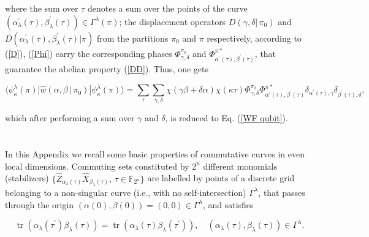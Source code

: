 \documentclass[quantumrep,article,submit,pdftex,moreauthors]{Definitions/mdpi}
\DeclareMathOperator{\tr}{tr}
\begin{document}
where the sum over $\tau$ denotes a sum over the points of the curve
$\left(\alpha_{\lambda}^{\prime}(\tau),\beta_{\lambda}^{\prime}(\tau)\right) \in
\Gamma^{\lambda}(\pi)$; the displacement operators $D\left(\gamma,\delta
|\,\pi_{0}\right)$ and
$D\left(\alpha_{\lambda}^{\prime}(\tau),\beta_{\lambda}^{\prime
}(\tau)|\pi\right)$ from the partitions $\pi_{0}$ and $\pi$ respectively,
according to (\ref{D}), (\ref{Phi}) carry the corresponding phases
$\Phi_{\gamma,\delta}^{\pi_{0}}$ and
$\Phi_{\alpha^{\prime}(\tau),\beta^{\prime}(\tau )}^{\pi \ast }$, that guarantee
the abelian property (\ref{DD}). Thus, one gets

\begin{equation}
  \langle \psi_{\kappa}^{\lambda }(\pi)
  |\hat{w}\left(\alpha,\beta\,|\,\pi _{0}\right)
  |\psi_{\kappa}^{\lambda}(\pi)\rangle
  = \sum_{\tau}\sum\limits_{\gamma,\delta}
  \chi\left(\gamma \beta +\delta \alpha\right) \chi (\kappa \tau)
  \Phi_{\gamma,\delta }^{\pi_{0}}
  \Phi_{\alpha^{\prime}(\tau),\beta^{\prime}(\tau)}^{\pi\ast}
  \delta_{\alpha^{\prime }(\tau),\gamma}
  \delta_{\beta^{\prime }(\tau),\delta},
\end{equation}

which after performing a sum over $\gamma$ and $\delta$, is reduced to
Eq. (\ref{WF qubit}).

\color{black}

\section[\appendixname~\thesection]{}
\label{appB}

In this Appendix we recall some basic properties of commutative curves in even
local dimensions. Commuting sets constituted by $2^{n}$ different monomials
(stabilizers)
$\{\hat{Z}_{\alpha_{\lambda}(\tau)}\hat{X}_{\beta_{\lambda}(\tau)}, \, \tau \in
\mathbb{F}_{2^{n}}\}$ are labelled by points of a discrete grid belonging to a
non-singular curve (i.e., with no self-intersection) $\Gamma^{\lambda}$, that
passes through the origin $(\alpha (0),\beta (0))=(0,0)\in \Gamma^{\lambda }$,
and satisfies

\begin{equation*}
  \tr\left( \alpha_{\lambda}(\tau^{\prime})\beta_{\lambda}(\tau) \right)
  = \tr \left( \alpha_{\lambda}(\tau)\beta_{\lambda}(\tau^{\prime }) \right),
  \quad \left( \alpha_{\lambda }(\tau), \beta_{\lambda}(\tau) \right)
  \in \Gamma^{\lambda}.
\end{equation*}
\end{document}
